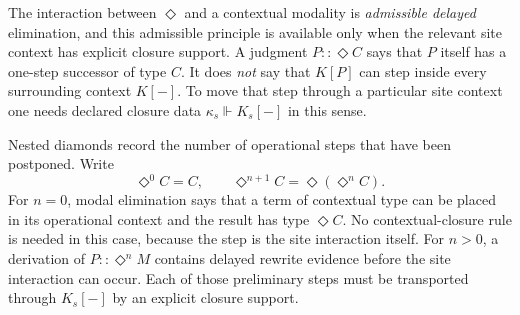 \documentclass[11pt]{article}
\newcommand{\ty}{\mathrel{::}}
\newcommand{\Dia}{\Diamond}
\begin{document}
The interaction between \(\Dia\) and a contextual modality is \emph{admissible delayed}
elimination, and this admissible principle is available only when the relevant
site context has explicit closure support.  A judgment \(P\ty\Dia C\) says that \(P\) itself
has a one-step successor of type \(C\).  It does \emph{not} say that
\(K[P]\) can step inside every surrounding context \(K[-]\).  To move that step
through a particular site context one needs declared closure data
\(\kappa_s\Vdash K_s[-]\) in this sense.

Nested diamonds record the number of operational steps that have been postponed.
Write
\[
  \Dia^0 C = C,
  \qquad
  \Dia^{n+1}C = \Dia(\Dia^n C).
\]
For \(n=0\), modal elimination says that a term of contextual type can be
placed in its operational context and the result has type \(\Dia C\).  No
contextual-closure rule is needed in this case, because the step is the site
interaction itself.  For \(n>0\), a derivation of
\(P\ty\Dia^n M\) contains delayed rewrite evidence before the site interaction
can occur.  Each of those preliminary steps must be transported through
\(K_s[-]\) by an explicit closure support.
\end{document}
